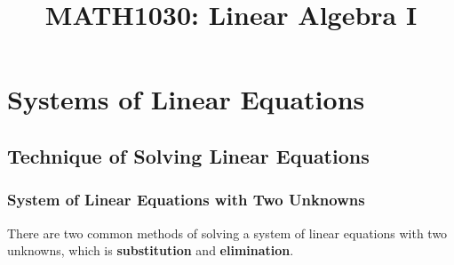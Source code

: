 \documentclass[a4paper,12pt]{article}
\begin{document}
\title{MATH1030: Linear Algebra I}


\remark{}



\section{Systems of Linear Equations}
\subsection{Technique of Solving Linear Equations}
\subsubsection{System of Linear Equations with Two Unknowns}
There are two common methods of solving a system of linear equations with two unknowns, which is \textbf{substitution} and \textbf{elimination}.
\end{document}
